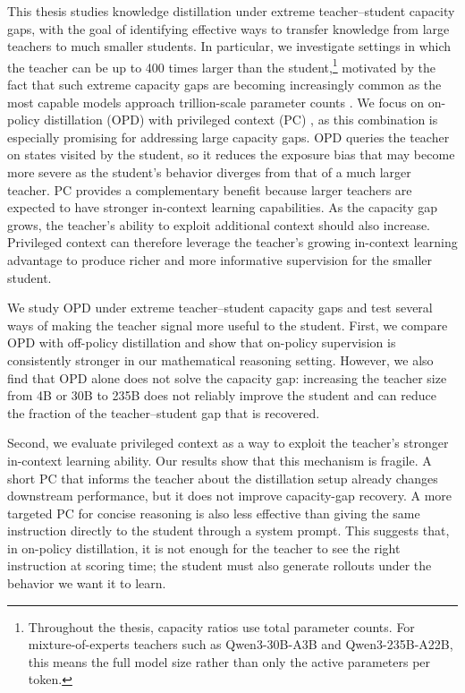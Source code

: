 This thesis studies knowledge distillation under extreme teacher–student capacity gaps, with the goal of identifying effective ways to transfer knowledge from large teachers to much smaller students. In particular, we investigate settings in which the teacher can be up to 400 times larger than the student,\footnote{Throughout the thesis, capacity ratios use total parameter counts. For mixture-of-experts teachers such as Qwen3-30B-A3B and Qwen3-235B-A22B, this means the full model size rather than only the active parameters per token.} motivated by the fact that such extreme capacity gaps are becoming increasingly common as the most capable models approach trillion-scale parameter counts \citep{team2026KimiK2Open, deepseekai2026deepseekv4, glm-5-team2026GLM5VibeCoding}. We focus on on-policy distillation (OPD) \citep{agarwalOnPolicyDistillationLanguage2024, guMiniLLMOnPolicyDistillation2026, luOnPolicyDistillation2025} with privileged context (PC) \citep{penalozaPrivilegedInformationDistillation2026, zhaoSelfDistilledReasonerOnPolicy2026, shenfeldSelfDistillationEnablesContinual2026}, as this combination is especially promising for addressing large capacity gaps. OPD queries the teacher on states visited by the student, so it reduces the exposure bias that may become more severe as the student’s behavior diverges from that of a much larger teacher. PC provides a complementary benefit because larger teachers are expected to have stronger in-context learning capabilities. As the capacity gap grows, the teacher’s ability to exploit additional context should also increase. Privileged context can therefore leverage the teacher’s growing in-context learning advantage to produce richer and more informative supervision for the smaller student.

We study OPD under extreme teacher--student capacity gaps and test several ways of making the teacher signal more useful to the student. First, we compare OPD with off-policy distillation and show that on-policy supervision is consistently stronger in our mathematical reasoning setting. However, we also find that OPD alone does not solve the capacity gap: increasing the teacher size from 4B or 30B to 235B does not reliably improve the student and can reduce the fraction of the teacher--student gap that is recovered.

Second, we evaluate privileged context as a way to exploit the teacher's stronger in-context learning ability. Our results show that this mechanism is fragile. A short PC that informs the teacher about the distillation setup already changes downstream performance, but it does not improve capacity-gap recovery. A more targeted PC for concise reasoning is also less effective than giving the same instruction directly to the student through a system prompt. This suggests that, in on-policy distillation, it is not enough for the teacher to see the right instruction at scoring time; the student must also generate rollouts under the behavior we want it to learn.

